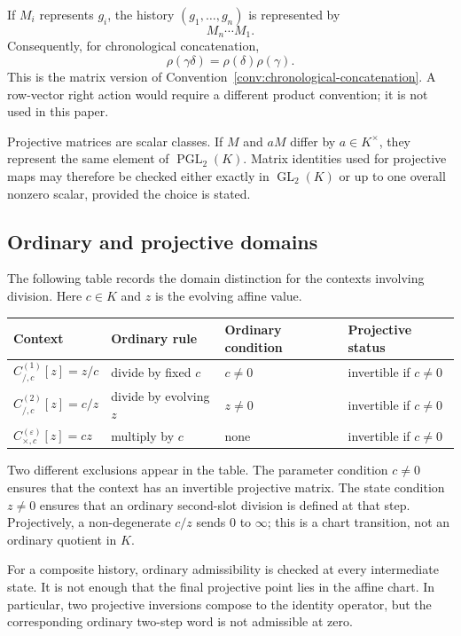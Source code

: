 If $M_i$ represents $g_i$, the history $(g_1,\ldots,g_n)$ is represented by
\[
  M_n\cdots M_1.
\]
Consequently, for chronological concatenation,
\begin{equation}
  \rho(\gamma\delta)=\rho(\delta)\rho(\gamma).
  \label{eq:appendix-rho-composition-order}
\end{equation}
This is the matrix version of
Convention~\ref{conv:chronological-concatenation}.  A row-vector right action
would require a different product convention; it is not used in this paper.

Projective matrices are scalar classes.  If $M$ and $aM$ differ by
$a\in K^\times$, they represent the same element of
$\operatorname{PGL}_2(K)$.  Matrix identities used for projective maps may
therefore be checked either exactly in $\operatorname{GL}_2(K)$ or up to one
overall nonzero scalar, provided the choice is stated.

\subsection{Ordinary and projective domains}

The following table records the domain distinction for the contexts involving
division.  Here $c\in K$ and $z$ is the evolving affine value.

\begin{center}
\renewcommand{\arraystretch}{1.35}
\begin{tabular}{llll}
\toprule
Context & Ordinary rule & Ordinary condition & Projective status \\
\midrule
$C_{/,c}^{(1)}[z]=z/c$
& divide by fixed $c$
& $c\ne0$
& invertible if $c\ne0$ \\
$C_{/,c}^{(2)}[z]=c/z$
& divide by evolving $z$
& $z\ne0$
& invertible if $c\ne0$ \\
$C_{\times,c}^{(\varepsilon)}[z]=cz$
& multiply by $c$
& none
& invertible if $c\ne0$ \\
\bottomrule
\end{tabular}
\end{center}

Two different exclusions appear in the table.  The parameter condition
$c\ne0$ ensures that the context has an invertible projective matrix.  The
state condition $z\ne0$ ensures that an ordinary second-slot division is
defined at that step.  Projectively, a non-degenerate $c/z$ sends $0$ to
$\infty$; this is a chart transition, not an ordinary quotient in $K$.

For a composite history, ordinary admissibility is checked at every
intermediate state.  It is not enough that the final projective point lies in
the affine chart.  In particular, two projective inversions compose to the
identity operator, but the corresponding ordinary two-step word is not
admissible at zero.

